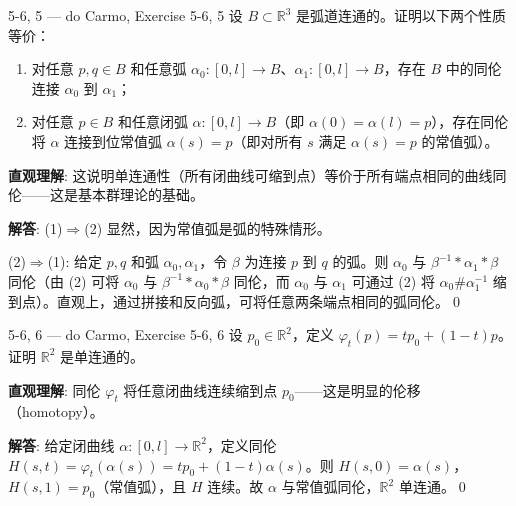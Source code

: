 \begin{exercise}{5-6, 5 — do Carmo, Exercise 5-6, 5}
设 $B \subset \mathbb{R}^3$ 是弧道连通的。证明以下两个性质等价：
\begin{enumerate}
\item 对任意 $p,q \in B$ 和任意弧 $\alpha_0: [0,l] \to B$、$\alpha_1: [0,l] \to B$，存在 $B$ 中的同伦连接 $\alpha_0$ 到 $\alpha_1$；
\item 对任意 $p \in B$ 和任意闭弧 $\alpha: [0,l] \to B$（即 $\alpha(0) = \alpha(l) = p$），存在同伦将 $\alpha$ 连接到位常值弧 $\alpha(s) = p$（即对所有 $s$ 满足 $\alpha(s) = p$ 的常值弧）。
\end{enumerate}
\end{exercise}
\begin{solution}
\textbf{直观理解}: 这说明单连通性（所有闭曲线可缩到点）等价于所有端点相同的曲线同伦——这是基本群理论的基础。

\textbf{解答}: (1)$\Rightarrow$(2) 显然，因为常值弧是弧的特殊情形。

(2)$\Rightarrow$(1): 给定 $p,q$ 和弧 $\alpha_0,\alpha_1$，令 $\beta$ 为连接 $p$ 到 $q$ 的弧。则 $\alpha_0$ 与 $\beta^{-1}\ast\alpha_1\ast\beta$ 同伦（由 (2) 可将 $\alpha_0$ 与 $\beta^{-1}\ast\alpha_0\ast\beta$ 同伦，而 $\alpha_0$ 与 $\alpha_1$ 可通过 (2) 将 $\alpha_0\#\alpha_1^{-1}$ 缩到点）。直观上，通过拼接和反向弧，可将任意两条端点相同的弧同伦。\qed
\end{solution}

\begin{exercise}{5-6, 6 — do Carmo, Exercise 5-6, 6}
设 $p_0 \in \mathbb{R}^2$，定义 $\varphi_t(p) = tp_0 + (1-t)p$。证明 $\mathbb{R}^2$ 是单连通的。
\end{exercise}
\begin{solution}
\textbf{直观理解}: 同伦 $\varphi_t$ 将任意闭曲线连续缩到点 $p_0$——这是明显的伦移（homotopy）。

\textbf{解答}: 给定闭曲线 $\alpha: [0,l]\to\mathbb{R}^2$，定义同伦 $H(s,t)=\varphi_t(\alpha(s))=tp_0+(1-t)\alpha(s)$。则 $H(s,0)=\alpha(s)$，$H(s,1)=p_0$（常值弧），且 $H$ 连续。故 $\alpha$ 与常值弧同伦，$\mathbb{R}^2$ 单连通。\qed
\end{solution}


